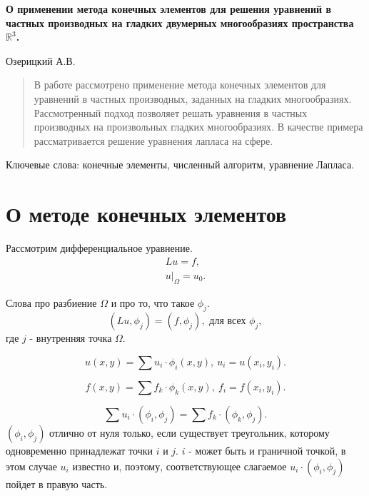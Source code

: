\documentclass[a4paper]{article}
\begin{document}

{\bf \Large О применении метода конечных элементов для решения
  уравнений в частных производных на гладких двумерных многообразиях
  пространства ${\mathbb R}^{3}$.}

\begin{center}
Озерицкий А.В.
\end{center}

\renewcommand{\abstractname}{}
\begin{abstract}
{\small
{}
В работе рассмотрено применение метода конечных элементов для
уравнений в частных производных, заданных на гладких многообразиях.
Рассмотренный подход позволяет решать уравнения в частных производных
на произвольных гладких многообразиях. 
В качестве примера рассматривается решение уравнения лапласа на сфере.}
\end{abstract}

Ключевые слова: конечные элементы, численный алгоритм, уравнение
Лапласа.

\section*{О методе конечных элементов}
Рассмотрим дифференциальное уравнение.
\begin{equation*}
\begin{split}
Lu = f,\\
u|_\Omega=u_0.
\end{split}
\end{equation*}

Слова про разбиение $\Omega$ и про то, что такое $\phi_j$.
\begin{equation*}
(Lu, \phi_j) = (f, \phi_j), \text{ для всех } \phi_j,
\end{equation*}
где $j$ - внутренняя точка $\Omega$.

\begin{equation*}
u(x,y)=\sum u_i \cdot \phi_i (x, y),\ u_i=u(x_i,y_i).
\end{equation*}

\begin{equation*}
f(x,y)=\sum f_k \cdot \phi_k (x, y),\ f_i=f(x_i,y_i).
\end{equation*}

\begin{equation*}
\sum u_i \cdot (\phi_i, \phi_j) = \sum f_k \cdot (\phi_k, \phi_j).
\end{equation*}
$(\phi_i, \phi_j)$ отлично от нуля только, если существует треугольник,
которому одновременно принадлежат точки $i$ и $j$. $i$ - может быть и
граничной точкой, в этом случае $u_i$ известно и, поэтому,
соответствующее слагаемое $u_i\cdot (\phi_i, \phi_j)$ пойдет в правую часть.
\end{document}
